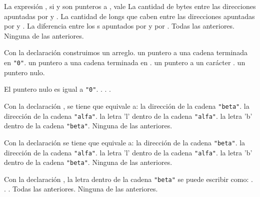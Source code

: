 \begin{preguntas}
\question La expresión , si  y  son punteros a , vale
\choice La cantidad de bytes entre las direcciones apuntadas por  y .
\correctchoice La cantidad de longs que caben entre las direcciones apuntadas por  y .
\choice La diferencia entre los s apuntados por  y por .
\choice Todas las anteriores.
\choice Ninguna de las anteriores.

\question Con la declaración  construimos
\choice un arreglo.
\choice un puntero a una cadena terminada en \lstinline{"0"}.
\correctchoice un puntero a una cadena terminada en .
\choice un puntero a un carácter .
\choice un puntero nulo.

\question El puntero nulo es igual a
\choice \lstinline{"0"}.
\correctchoice {}.
\choice {}.
\choice {}.

\question Con la declaración , se tiene que  equivale a:
\correctchoice la dirección de la cadena \lstinline{"beta"}.
\choice la dirección de la cadena \lstinline{"alfa"}.
\choice la letra 'l' dentro de la cadena \lstinline{"alfa"}.
\choice la letra 'b' dentro de la cadena \lstinline{"beta"}.
\choice Ninguna de las anteriores.

\question Con la declaración  se tiene que  equivale a:
\choice la dirección de la cadena \lstinline{"beta"}.
\choice la dirección de la cadena \lstinline{"alfa"}.
\choice la letra 'l' dentro de la cadena \lstinline{"alfa"}.
\correctchoice la letra 'b' dentro de la cadena \lstinline{"beta"}.
\choice Ninguna de las anteriores.

\question Con la declaración , la letra  dentro de la cadena \lstinline{"beta"} se puede escribir como:
\choice {}.
\choice {}.
\choice {}.
\correctchoice Todas las anteriores.
\choice Ninguna de las anteriores.

\end{preguntas}
